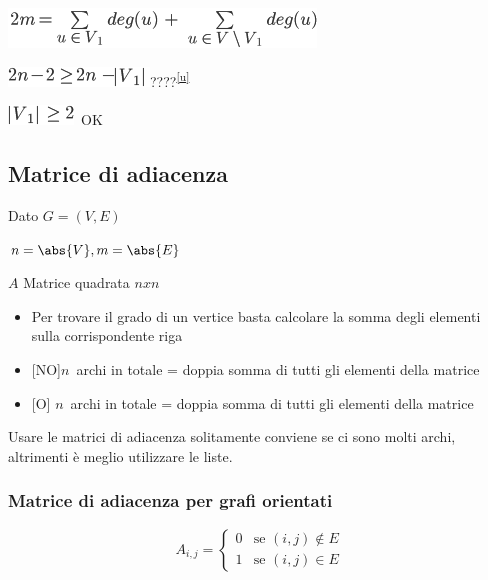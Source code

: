 \documentclass{article}
\providecommand{\tightlist}{%
  \setlength{\itemsep}{0pt}\setlength{\parskip}{0pt}}
\begin{document}
{\includegraphics{images/image382.png}

\includegraphics{images/image383.png}{????}\textsuperscript{\protect\hyperlink{cmnt21}{{[}u{]}}}

\includegraphics{images/image384.png}{~OK}

{}

{}

\hypertarget{h.viqjw1dxzez8}{\subsection{\texorpdfstring{{Matrice di
adiacenza }}{Matrice di adiacenza }}\label{h.viqjw1dxzez8}}

{Dato }$G=(V,E)${~}

$n=\abs{V},m=\abs{E}$

{$A$ Matrice quadrata $n x n$ }

\begin{itemize}
\tightlist
\item
  {Per trovare il grado di un vertice basta calcolare la somma degli
  elementi sulla corrispondente riga}
\item
  {{[}NO{]}}$n${~archi in totale =
  doppia somma di tutti gli elementi della matrice}
\item
  {{[}O{]} }$n${~archi in totale =
  doppia somma di tutti gli elementi della matrice}
\end{itemize}

{}

{Usare le matrici di adiacenza solitamente conviene se ci sono molti
archi, altrimenti è meglio utilizzare le liste.}

\hypertarget{h.30h8k4akc7l}{\subsubsection{\texorpdfstring{{Matrice di adiacenza per grafi orientati}}{Matrice di adiacenza per grafi orientati}}\label{h.30h8k4akc7l}}


\begin{equation}
A_{i,j} = 
\begin{cases}
0 & \mbox{se } (i,j) \notin E \\ 
1 & \mbox{se } (i,j) \in E
\end{cases}
\end{equation}

}
\end{document}
